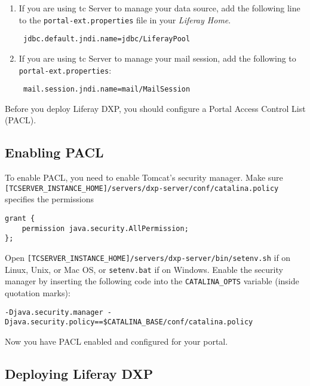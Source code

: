 \begin{enumerate}
\def\labelenumi{\arabic{enumi}.}
\item
  If you are using tc Server to manage your data source, add the
  following line to the \texttt{portal-ext.properties} file in your
  \emph{Liferay Home}.

\begin{verbatim}
 jdbc.default.jndi.name=jdbc/LiferayPool
\end{verbatim}
\item
  If you are using tc Server to manage your mail session, add the
  following to \texttt{portal-ext.properties}:

\begin{verbatim}
 mail.session.jndi.name=mail/MailSession
\end{verbatim}
\end{enumerate}

Before you deploy Liferay DXP, you should configure a Portal Access
Control List (PACL).

\subsection{Enabling PACL}\label{enabling-pacl-1}

To enable PACL, you need to enable Tomcat's security manager. Make sure
\texttt{{[}TCSERVER\_INSTANCE\_HOME{]}/servers/dxp-server/conf/catalina.policy}
specifies the permissions

\begin{verbatim}
grant {
    permission java.security.AllPermission;
};
\end{verbatim}

Open
\texttt{{[}TCSERVER\_INSTANCE\_HOME{]}/servers/dxp-server/bin/setenv.sh}
if on Linux, Unix, or Mac OS, or \texttt{setenv.bat} if on Windows.
Enable the security manager by inserting the following code into the
\texttt{CATALINA\_OPTS} variable (inside quotation marks):

\begin{verbatim}
-Djava.security.manager -Djava.security.policy==$CATALINA_BASE/conf/catalina.policy
\end{verbatim}

Now you have PACL enabled and configured for your portal.

\subsection{Deploying Liferay DXP}\label{deploying-liferay-dxp-2}

